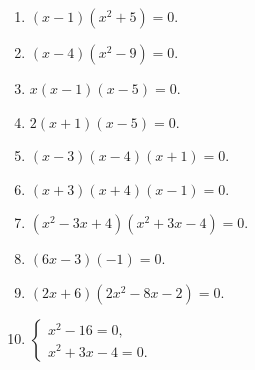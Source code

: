 \documentclass[a4paper,12pt]{article}
\begin{document}
\begin{enumerate}[leftmargin=9mm,itemsep=2pt]
\item \((x-1)(x^2+5)=0\).
\item \((x-4)(x^2-9)=0\).
\item \(x(x-1)(x-5)=0\).
\item \(2(x+1)(x-5)=0\).
\item \((x-3)(x-4)(x+1)=0\).
\item \((x+3)(x+4)(x-1)=0\).
\item \((x^2-3x+4)(x^2+3x-4)=0\).
\item \((6x-3)(-1)=0\).
\item \((2x+6)(2x^2-8x-2)=0\).
\item \(\begin{cases}x^2-16=0,\\ x^2+3x-4=0.\end{cases}\)
\end{enumerate}
\end{document}
